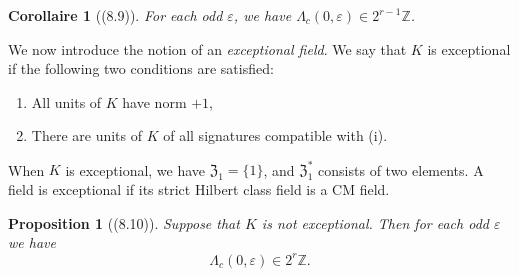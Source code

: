 \documentclass[12pt,a4paper]{article}
\theoremstyle{plain}
\newtheorem{proposition}[theorem]{Proposition}
\newtheorem{corollary}[theorem]{Corollaire}
\theoremstyle{definition}
\theoremstyle{remark}
\begin{document}
\begin{corollary}[(8.9)]\label{cor:8.9}
For each odd $\varepsilon$, we have $\varLambda_c(0, \varepsilon) \in 2^{r-1}\mathbb{Z}$.
\end{corollary}

We now introduce the notion of an \emph{exceptional field}. We say that $K$ is exceptional if the following two conditions are satisfied:
\begin{enumerate}[label=\roman*)]
\item All units of $K$ have norm $+1$,
\item There are units of $K$ of all signatures compatible with (i).
\end{enumerate}
When $K$ is exceptional, we have $\mathfrak{Z}_1 = \{1\}$, and $\mathfrak{Z}_1^*$ consists of two elements. A field is exceptional if its strict Hilbert class field is a CM field.

\begin{proposition}[(8.10)]\label{prop:8.10}
Suppose that $K$ is not exceptional. Then for each odd $\varepsilon$ we have
\[
\varLambda_c(0, \varepsilon) \in 2^r \mathbb{Z}.
\]
\end{proposition}
\end{document}
